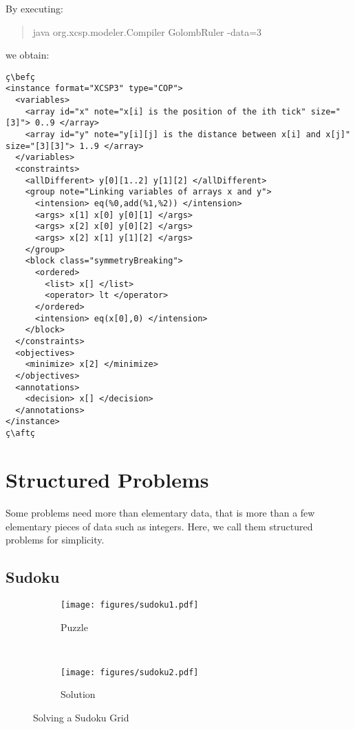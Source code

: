 \documentclass[10pt]{article}
\newenvironment{myvb}{\endgraf\small\verbatim}{\endverbatim}
\def\bef{\rule{10cm}{0.1mm}} %
\def\aft{\rule{10cm}{0.1mm}\medskip}
\begin{document}
By executing:
\begin{quote}
\begin{myvb}
java org.xcsp.modeler.Compiler GolombRuler -data=3
\end{myvb}
\end{quote}
we obtain:
\begin{lstlisting}
ç\befç
<instance format="XCSP3" type="COP">
  <variables>
    <array id="x" note="x[i] is the position of the ith tick" size="[3]"> 0..9 </array>
    <array id="y" note="y[i][j] is the distance between x[i] and x[j]" size="[3][3]"> 1..9 </array>
  </variables>
  <constraints>
    <allDifferent> y[0][1..2] y[1][2] </allDifferent>
    <group note="Linking variables of arrays x and y">
      <intension> eq(%0,add(%1,%2)) </intension>
      <args> x[1] x[0] y[0][1] </args>
      <args> x[2] x[0] y[0][2] </args>
      <args> x[2] x[1] y[1][2] </args>
    </group>
    <block class="symmetryBreaking">
      <ordered>
        <list> x[] </list>
        <operator> lt </operator>
      </ordered>
      <intension> eq(x[0],0) </intension>
    </block>
  </constraints>
  <objectives>
    <minimize> x[2] </minimize>
  </objectives>
  <annotations>
    <decision> x[] </decision>
  </annotations>
</instance>
ç\aftç
\end{lstlisting}



\section{Structured Problems}

Some problems need more than elementary data, that is more than a few elementary pieces of data such as integers. 
Here, we call them structured problems for simplicity.

\subsection{Sudoku}

\begin{figure}[h]
  \centering
    \begin{subfigure}[t]{0.5\textwidth}
        \centering
        \texttt{[image: figures/sudoku1.pdf]}
        \caption{Puzzle}
    \end{subfigure}%
    ~ 
    \begin{subfigure}[t]{0.5\textwidth}
        \centering
        \texttt{[image: figures/sudoku2.pdf]}
        \caption{Solution}
    \end{subfigure}
    \caption{Solving a Sudoku Grid\label{fig:sudoku}}
\end{figure}
\end{document}
